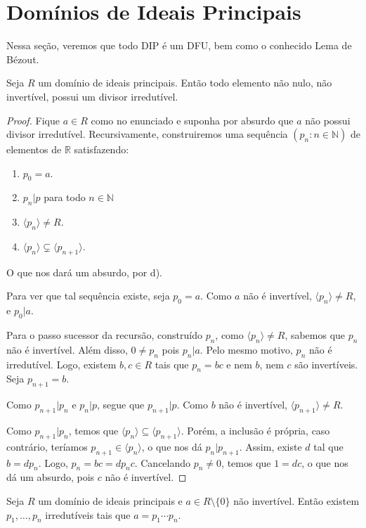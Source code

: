 \section{Domínios de Ideais Principais}
Nessa seção, veremos que todo DIP é um DFU, bem como o conhecido Lema de Bézout.
\begin{lemma}
Seja $R$ um domínio de ideais principais. Então todo elemento não nulo, não invertível, possui um divisor irredutível.
\end{lemma}
\begin{proof}
    Fique $a \in R$ como no enunciado e suponha por absurdo que $a$ não possui divisor irredutível. Recursivamente, construiremos uma sequência $(p_n: n \in \mathbb N)$ de elementos de $\mathbb R$ satisfazendo:
    \begin{enumerate}[label=\alph*)]
        \item $p_0=a$.
        \item $p_n|p$ para todo $n \in \mathbb N$
        \item $\langle p_n\rangle\neq R$.
        \item $\langle p_n\rangle\subsetneq \langle p_{n+1}\rangle$.
    \end{enumerate}
    O que nos dará um absurdo, por d).

    Para ver que tal sequência existe, seja $p_0=a$. Como $a$ não é invertível, $\langle p_n\rangle \neq R$, e $p_0|a$.

    Para o passo sucessor da recursão, construído $p_n$, como $\langle p_n\rangle\neq R$, sabemos que $p_n$ não é invertível.
    Além disso, $0\neq p_n$ pois $p_n|a$.
    Pelo mesmo motivo, $p_n$ não é irredutível.
    Logo, existem $b, c \in R$ tais que $p_n=bc$ e nem $b$, nem $c$ são invertíveis.
    Seja $p_{n+1}=b$.

    Como $p_{n+1}|p_n$ e $p_n|p$, segue que $p_{n+1}|p$.
    Como $b$ não é invertível, $\langle p_{n+1}\rangle\neq R$.

    Como $p_{n+1}|p_n$, temos que $\langle p_n\rangle\subseteq \langle p_{n+1}\rangle$.
    Porém, a inclusão é própria, caso contrário, teríamos $p_{n+1}\in \langle p_n\rangle$, o que nos dá $p_n|p_{n+1}$.
    Assim, existe $d$ tal que $b=dp_n$.
    Logo, $p_n=bc=dp_nc$.
    Cancelando $p_n\neq 0$, temos que $1=dc$, o que nos dá um absurdo, pois $c$ não é invertível.
\end{proof}

\begin{lemma}
    Seja $R$ um domínio de ideais principais e $a\in R\setminus \{0\}$ não invertível.
    Então existem $p_1, \dots, p_n$ irredutíveis tais que $a=p_1\cdots p_n$.
\end{lemma}

